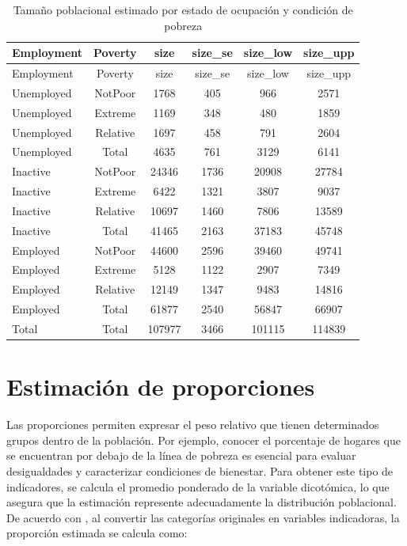 \documentclass[
  spanish,
  12pt,
]{book}
\begin{document}
\begin{longtable}[]{@{}lccccc@{}}
\caption{\label{tab:tab-tamano-empleo-pobreza}Tamaño poblacional estimado por estado de ocupación y condición de pobreza}\tabularnewline
\toprule\noalign{}
Employment & Poverty & size & size\_se & size\_low & size\_upp \\
\midrule\noalign{}
\endfirsthead
\toprule\noalign{}
Employment & Poverty & size & size\_se & size\_low & size\_upp \\
\midrule\noalign{}
\endhead
\bottomrule\noalign{}
\endlastfoot
Unemployed & NotPoor & 1768 & 405 & 966 & 2571 \\
Unemployed & Extreme & 1169 & 348 & 480 & 1859 \\
Unemployed & Relative & 1697 & 458 & 791 & 2604 \\
Unemployed & Total & 4635 & 761 & 3129 & 6141 \\
Inactive & NotPoor & 24346 & 1736 & 20908 & 27784 \\
Inactive & Extreme & 6422 & 1321 & 3807 & 9037 \\
Inactive & Relative & 10697 & 1460 & 7806 & 13589 \\
Inactive & Total & 41465 & 2163 & 37183 & 45748 \\
Employed & NotPoor & 44600 & 2596 & 39460 & 49741 \\
Employed & Extreme & 5128 & 1122 & 2907 & 7349 \\
Employed & Relative & 12149 & 1347 & 9483 & 14816 \\
Employed & Total & 61877 & 2540 & 56847 & 66907 \\
Total & Total & 107977 & 3466 & 101115 & 114839 \\
\end{longtable}

\section{Estimación de proporciones}\label{estimacion-de-proporciones}

Las proporciones permiten expresar el peso relativo que tienen determinados grupos dentro de la población. Por ejemplo, conocer el porcentaje de hogares que se encuentran por debajo de la línea de pobreza es esencial para evaluar desigualdades y caracterizar condiciones de bienestar. Para obtener este tipo de indicadores, se calcula el promedio ponderado de la variable dicotómica, lo que asegura que la estimación represente adecuadamente la distribución poblacional. De acuerdo con \citet{heeringa2017applied}, al convertir las categorías originales en variables indicadoras, la proporción estimada se calcula como:
\end{document}
